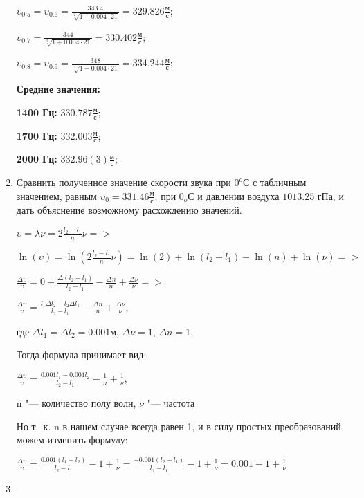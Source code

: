 \begin{enumerate}
{            $\upsilon_{0.5} = \upsilon_{0.6} = \frac{343.4}{\sqrt[2]{1 + 0.004 \cdot 21}} = 329.826 \frac{\text{м}}{\text{с}}$;

            $\upsilon_{0.7} = \frac{344}{\sqrt[2]{1 + 0.004 \cdot 21}} = 330.402 \frac{\text{м}}{\text{с}}$;

            $\upsilon_{0.8} = \upsilon_{0.9} = \frac{348}{\sqrt[2]{1 + 0.004 \cdot 21}} = 334.244 \frac{\text{м}}{\text{с}}$;

            \textbf{Средние значения:}

            \textbf{1400 Гц:} $330.787 \frac{\text{м}}{\text{с}}$;

            \textbf{1700 Гц:} $332.003 \frac{\text{м}}{\text{с}}$;

            \textbf{2000 Гц:} $332.96(3) \frac{\text{м}}{\text{с}}$;
        }
    \item{Сравнить полученное значение скорости звука при $0^o$С с табличным значением, равным $\upsilon_0 = 331.46 \frac{\text{м}}{\text{с}}$; при $0_o$С и давлении воздуха $1013.25$ гПа, и дать объяснение возможному расхождению значений.

            \begin{center}
                $\upsilon = \lambda \nu = 2 \frac{l_2 - l_1}{n} \nu =>$

                $\ln \left (\upsilon \right ) = \ln \left (2 \frac{l_2 - l_1}{n} \nu \right ) = \ln \left (2 \right ) + \ln \left (l_2 - l_1 \right ) - \ln \left (n \right ) + \ln \left (\nu \right ) =>$

                $\frac{\Delta \upsilon}{\upsilon} = 0 + \frac{\Delta \left(l_2 - l_1 \right )}{l_2 - l_1} - \frac{\Delta n}{n} + \frac{\Delta \nu}{\nu} =>$

                $\frac{\Delta \upsilon}{\upsilon} = \frac{l_1 \Delta l_2 - l_2 \Delta l_1}{l_2 - l_1} - \frac{\Delta n}{n} + \frac{\Delta \nu}{\nu}$,
            \end{center}
            где $\Delta l_1 = \Delta l_2 = 0.001 \text{м}$, $\Delta \nu = 1$, $\Delta n = 1$.

            Тогда формула принимает вид:

            $\frac{\Delta \upsilon}{\upsilon} = \frac{0.001 l_1 - 0.001 l_2}{l_2 - l_1} - \frac{1}{n} + \frac{1}{\nu}$,

            n "--- количество полу волн, $\nu$ "--- частота

            Но т. к. n в нашем случае всегда равен 1, и в силу простых преобразований можем изменить формулу:

            $\frac{\Delta \upsilon}{\upsilon} = \frac{0.001 \left(l_1 - l_2 \right )}{l_2 - l_1} - 1 + \frac{1}{\nu} = \frac{-0.001 \left (l_2 - l_1 \right )}{l_2 - l_1} - 1 + \frac{1}{\nu} = 0.001 - 1 + \frac{1}{\nu}$
        }
    \item{}
\end{enumerate}





















